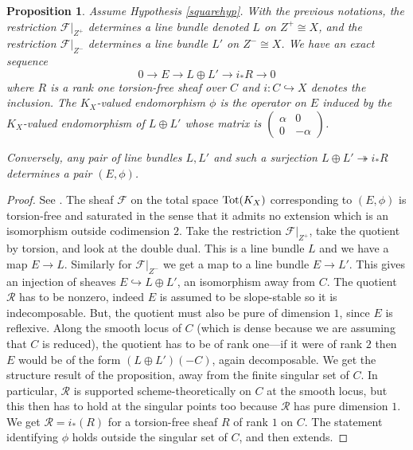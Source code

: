\documentclass{amsart}
\theoremstyle{plain}
\newtheorem{proposition}[theorem]{Proposition}
\numberwithin{equation}{section}
\begin{document}
\begin{proposition}
\label{squarecase}
Assume Hypothesis \ref{squarehyp}. With the previous notations, 
the restriction ${{\mathcal F}} |_{Z^+}$ determines a line bundle denoted $L$ on $Z^+\cong X$, and the restriction
${{\mathcal F}} |_{Z^-}$ determines a line bundle $L'$ on $Z^-\cong X$. We have an exact sequence 
\begin{equation}
\label{mainseq}
0\rightarrow E \rightarrow L\oplus L' \rightarrow i_{\ast}R \rightarrow 0
\end{equation}
where $R$ is a rank one torsion-free sheaf over $C$ and $i:C\hookrightarrow X$ denotes
the inclusion. The $K_X$-valued endomorphism $\phi$ is 
the operator on $E$ induced by the $K_X$-valued endomorphism of $L\oplus L'$
whose matrix is $\left( 
\begin{array}{cc}
\alpha & 0 \\ 0 & -\alpha \end{array} \right) $. 

Conversely, any pair of line bundles $L,L'$ and such a surjection $L\oplus L' 
\twoheadrightarrow i_{\ast}R$ determines a pair
$(E,\phi )$. 
\end{proposition}
\begin{proof}
See \cite{Zuo}.
The sheaf ${{\mathcal F}}$ on the total space ${\rm Tot}(K_X)$ corresponding to $(E,\phi )$ \cite{BNR}
\cite{Donagi} \cite{Zuo} 
is torsion-free and saturated in the sense that it admits no extension 
which is an isomorphism outside codimension $2$. Take the restriction ${{\mathcal F}} |_{Z^{+}}$,
take the quotient 
by torsion, and look at the double dual. This is a line bundle $L$ and we have
a map $E\rightarrow L$. Similarly for ${{\mathcal F}} |_{Z^{-}}$ we get a map to a line bundle
$E\rightarrow L'$. This gives an injection of sheaves $E\hookrightarrow L\oplus L'$,
an isomorphism away from $C$.
The quotient ${{\mathcal R}} $ has to be nonzero, indeed $E$ is assumed to be slope-stable so it
is indecomposable. But, the quotient must also be pure of dimension $1$,
since $E$ is reflexive. Along the smooth locus of $C$ (which is dense because
we are assuming that $C$ is reduced), the quotient
has to be of rank one---if it were of rank $2$ then $E$ would be of the form
$(L\oplus L')(-C)$, again decomposable.  We get the structure result
of the proposition, away from the finite singular set of $C$. In particular,
${{\mathcal R}} $ is supported scheme-theoretically on $C$ at the smooth locus, but this then
has to hold at the singular points too because ${{\mathcal R}} $ has pure dimension $1$.
We get ${{\mathcal R}} =i_{\ast}(R)$ for a torsion-free sheaf $R$ of rank $1$ on $C$.  
The statement identifying $\phi$ holds outside the singular set of $C$,
and then extends. 
\end{proof}
\end{document}

